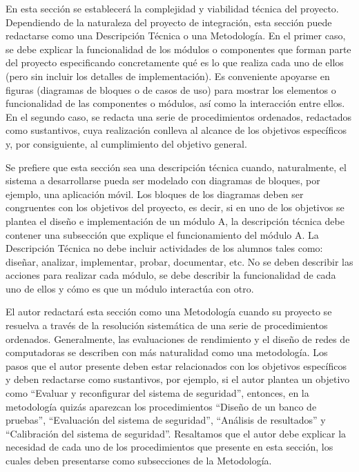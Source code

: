 En esta sección se establecerá la complejidad y viabilidad técnica del proyecto. Dependiendo de la naturaleza del proyecto de integración, esta sección puede redactarse como una Descripción Técnica o una Metodología. En el primer caso, se debe explicar la funcionalidad de los módulos o componentes que forman parte del proyecto especificando concretamente qué es lo que realiza cada uno de ellos (pero sin incluir los detalles de implementación). Es conveniente apoyarse en figuras (diagramas de bloques o de casos de uso) para mostrar los elementos o funcionalidad de las componentes o módulos, así como la interacción entre ellos. En el segundo caso, se redacta una serie de procedimientos ordenados, redactados como sustantivos, cuya realización conlleva al alcance de los objetivos específicos y, por consiguiente, al cumplimiento del objetivo general. 

Se prefiere que esta sección sea una descripción técnica cuando, naturalmente, el sistema a desarrollarse pueda ser modelado con diagramas de bloques, por ejemplo, una aplicación móvil. Los bloques de los diagramas deben ser congruentes con los objetivos del proyecto, es decir, si en uno de los objetivos se plantea el diseño e implementación de un módulo A, la descripción técnica debe contener una subsección que explique el funcionamiento del módulo A. La Descripción Técnica no debe incluir actividades de los alumnos tales como: diseñar, analizar, implementar, probar, documentar, etc. No se deben describir las acciones para realizar cada módulo, se debe describir la funcionalidad de cada uno de ellos y cómo es que un módulo interactúa con otro.

El autor redactará esta sección como una Metodología cuando su proyecto se resuelva a través de la resolución sistemática de una serie de procedimientos ordenados. Generalmente, las evaluaciones de rendimiento y el diseño de redes de computadoras se describen con más naturalidad como una metodología. Los pasos que el autor presente deben estar relacionados con los objetivos específicos y deben redactarse como sustantivos, por ejemplo, si el autor plantea un objetivo como ``Evaluar y reconfigurar del sistema de seguridad'', entonces, en la metodología quizás aparezcan los procedimientos ``Diseño de un banco de pruebas'', ``Evaluación del sistema de seguridad'', ``Análisis de resultados'' y ``Calibración del sistema de seguridad''. Resaltamos que el autor debe explicar la necesidad de cada uno de los procedimientos que presente en esta sección, los cuales deben presentarse como subsecciones de la Metodología.

